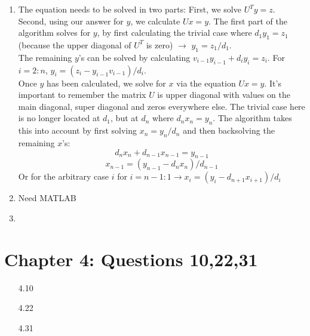 \documentclass[11pt,a4paper,draft]{article}
\begin{document}
\begin{itemize}
\begin{enumerate} [label={\alph*)}]
			\item The equation needs to be solved in two parts: First, we solve $U^Ty = z$. Second, using our answer for $y$, we calculate $Ux=y$. The first part of the algorithm solves for $y$, by first calculating the trivial case where $d_1y_1=z_1$ (because the upper diagonal of $U^T$ is zero) $\rightarrow$ $y_1 = z_1/d_1$.\\ The remaining $y$'s can be solved by calculating $v_{i-1}y_{i-1}+d_iy_i=z_i$. For $i = 2:n$, $y_i=(z_i-y_{i-1}v_{i-1})/d_i$. \\
			Once $y$ has been calculated, we solve for $x$ via the equation $Ux=y$. It's important to remember the matrix $U$ is upper diagonal with values on the main diagonal, super diagonal and zeros everywhere else. The trivial case here is no longer located at $d_1$, but at $d_n$ where $d_nx_n=y_n$. The algorithm takes this into account by first solving $x_n=y_n/d_n$ and then backsolving the remaining $x$'s: $$d_nx_n + d_{n-1}x_{n-1} = y_{n-1}$$ $$x_{n-1} = (y_{n-1}-d_nx_n)/d_{n-1}$$ Or for the arbitrary case $i$ for $i = n-1:1 \rightarrow x_{i} = (y_{i}-d_{n+1}x_{i+1})/d_{i}$
			
			\item Need MATLAB
			\item
			\end{enumerate}
			
	\end{itemize}
	
	\section{Chapter 4: Questions 10,22,31}
	\begin{itemize}
		\item [4.10]
		
		\item [4.22]
		
		\item [4.31]
	\end{itemize}
	
	
\end{document}
